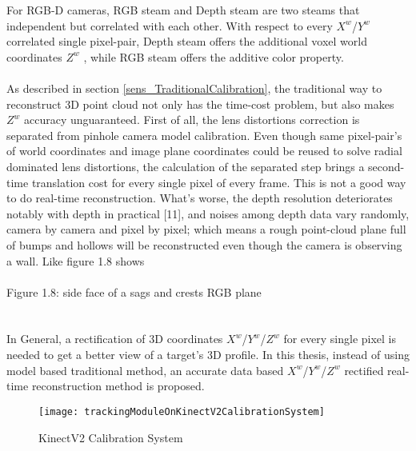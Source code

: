 	
For RGB-D cameras, RGB steam and Depth steam are two steams that independent but correlated with each other. With respect to every \(X^{w}\)/\(Y^{w}\)  correlated single pixel-pair, Depth steam offers the additional voxel world coordinates \(Z^{w}\) , while RGB steam offers the additive color property.
\\
\\As described in section \ref{sens_TraditionalCalibration}, the traditional way to reconstruct 3D point cloud not only has the time-cost problem, but also makes \(Z^{w}\) accuracy unguaranteed. First of all, the lens distortions correction is separated from pinhole camera model calibration. Even though same pixel-pair's of world coordinates and image plane coordinates could be reused to solve radial dominated lens distortions, the calculation of the separated step brings a second-time translation cost for every single pixel of every frame. This is not a good way to do real-time reconstruction. What's worse, the depth resolution deteriorates notably with depth in practical [11],
 and noises among depth data vary randomly, camera by camera and pixel by pixel; which means a rough point-cloud plane full of bumps and hollows will be reconstructed even though the camera is observing a wall. Like figure 1.8 shows%
\\\\Figure 1.8: side face of a sags and crests RGB plane 
\\\\
\\In General, a rectification of 3D coordinates \(X^{w}\)/\(Y^{w}\)/\(Z^{w}\)  for every single pixel is needed to get a better view of a target's 3D profile. In this thesis, instead of using model based traditional method, an accurate data based  \(X^{w}\)/\(Y^{w}\)/\(Z^{w}\) rectified real-time reconstruction method is proposed.\par

\begin{figure}[h]
\centering
\texttt{[image: trackingModuleOnKinectV2CalibrationSystem]}
\caption{KinectV2 Calibration System}
\label{trackingModuleOnKinectV2CalibrationSystem}
\end{figure}%

